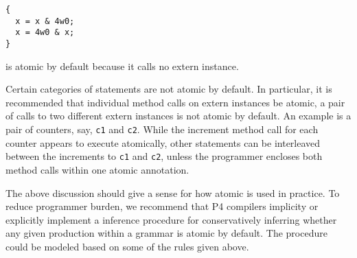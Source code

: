\begin{verbatim}
{
  x = x & 4w0;
  x = 4w0 & x;
}
\end{verbatim}
is atomic by default because it calls no extern instance.

Certain categories of statements are not atomic by default. In particular, it
is recommended that individual method calls on extern instances be atomic, a
pair of calls to two different extern instances is not atomic by default. An
example is a pair of counters, say, \texttt{c1} and \texttt{c2}. While the
increment method call for each counter appears to execute atomically, other
statements can be interleaved between the increments to \texttt{c1} and
\texttt{c2}, unless the programmer encloses both method calls within one atomic
annotation.

The above discussion should give a sense for how atomic is used in practice. To
reduce programmer burden, we recommend that P4 compilers implicity or
explicitly implement a inference procedure for conservatively inferring whether
any given production within a grammar is atomic by default. The procedure could
be modeled based on some of the rules given above.
